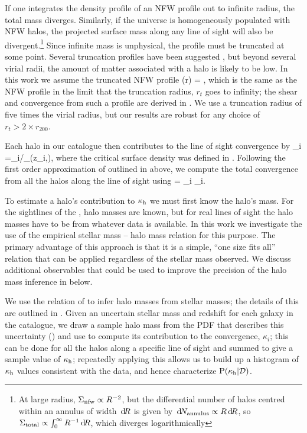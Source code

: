 \documentclass[useAMS,usenatbib]{mn2e}
\begin{document}
If one integrates the density profile of an NFW profile out to infinite
radius, the total mass diverges. Similarly, if the universe is
homogeneously populated with NFW halos, the projected surface mass along
any line of sight will also be divergent.\footnote{At large radius,
$\Sigma_{\rm nfw} \propto R^{-2}$, but the differential number of halos
centred within an annulus of width $\, \mathrm{d} \! R$ is given by $\, \mathrm{d} \! N_{\rm
annulus} \propto R \, \mathrm{d} \! R$, so  $\Sigma_{\rm total} \propto
\int_{0}^{\infty} R^{-1} \, \mathrm{d} \! R$, which diverges logarithmically} Since
infinite mass is unphysical, the profile must be truncated at some
point. Several truncation profiles have been suggested
\citep[e.g][]{BMO}, but beyond several virial radii, the amount of
matter associated with a halo is likely to be low. In this work we
assume the truncated NFW profile
\be\label{eq:bmoprofile}
\rho(r) = 
,
\ee
which is the same as the NFW profile in the limit that the truncation
radius, $r_t$ goes to infinity; the shear and convergence from such a
profile are derived in \citet{BMO}.
 We use a truncation radius of five times
the virial radius, but our results are robust for any choice of $r_t>2
\times r_{200}$. 

Each halo in our catalogue then contributes to
the line of sight convergence by
\be
\label{eq:kappai}
\kappa_i =\Sigma_{i}/\Sigma_{}(z_i,\zs),
\ee
where the critical surface density was defined in .
Following the first order approximation of \citet{HilbertEtal2009}
outlined in  above, we compute 
the total convergence from all the halos along the line
of sight using
\be 
\label{eq:kappasummu}
\kappah = \sum_{i} \kappa_i.
\ee

To estimate a halo's contribution to $\kappa_{\rm h}$ we must first know the
halo's mass. For the sightlines of the \MS, halo masses are
known, but for  real lines of sight the halo masses have to be \infered
from whatever data is available. 
In this work we investigate the use of the empirical stellar mass --
halo mass relation for this purpose. The primary advantage of this
approach is that it is a simple, ``one size fits all'' relation that can
be applied regardless of the stellar mass observed. We discuss
additional observables that could be used to improve the precision of
the halo mass inference in  below. 

We use the relation of \citet{BehrooziEtal2010} to infer halo masses
from stellar masses; the details of this \proceedure are outlined in 
. Given an uncertain stellar mass and redshift for
each galaxy in the  catalogue, we draw a sample halo mass from the PDF
that describes this uncertainty  ()  and use
 to compute its contribution to the convergence,
$\kappa_i$; this can be done for all the halos along a specific line of sight
and summed to give a sample value of $\kappa_{\rm h}$;  repeatedly applying
this \proceedure allows us to build up a histogram of $\kappa_{\rm h}$ values
consistent with the data, and hence characterize ${\rm P}(\kappa_{\rm h}|{\mathcal{D}})$. 
\end{document}
